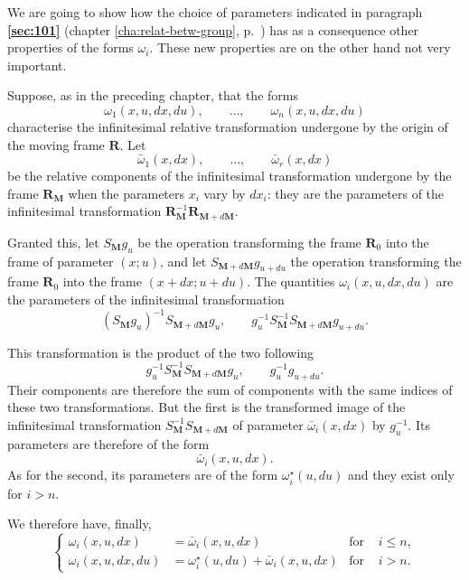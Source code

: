 \documentclass[leqno,11pt]{book}
\numberwithin{equation}{chapter}
\theoremstyle{shape1}
\theoremstyle{shapesmall}
\newcommand{\fsref}[1]{{\rm\textsection\textbf{\ref{sec:#1}}}}
\newcommand{\str}{^{\star}}
\begin{document}
{\small
We are going to show how the choice of parameters indicated in paragraph \fsref{101} (chapter \ref{cha:relat-betw-group}, p.~\pageref{sec:101}) has as a consequence other properties of the forms $\omega_{i}$. These new properties are on the other hand not very important.

Suppose, as in the preceding chapter, that the forms
\[
\omega_{1}(x,u,dx,du),\qquad\dots,\qquad\omega_{n}(x,u,dx,du)
\]
characterise the infinitesimal relative transformation undergone by the origin of the moving frame $\mathbf{R}$. Let 
\[
\bar\omega_{1}(x,dx),\qquad\dots,\qquad\bar\omega_{r}(x,dx)
\]
be the relative components of the infinitesimal transformation undergone by the frame $\mathbf{R}_{\mathbf{M}}$ when the parameters $x_{i}$ vary by $dx_{i}$: they are the parameters of the infinitesimal transformation $\mathbf{R}^{-1}_{\mathbf{M}}\mathbf{R}_{\mathbf{M}+d\mathbf{M}}$.

Granted this, let $S_{\mathbf{M}}g_{u}$ be the operation transforming the frame $\mathbf{R}_{0}$ into the frame of parameter $(x;u)$, and let $S_{\mathbf{M}+d\mathbf{M}}g_{u+du}$ the operation transforming the frame $\mathbf{R}_{0}$ into the frame $(x+dx;u+du)$. The quantities $\omega_{i}(x,u,dx,du)$ are the parameters of the infinitesimal transformation
\[
(S_{\mathbf{M}}g_{u})^{-1}S_{\mathbf{M}+d\mathbf{M}}g_{u},\qquad g^{-1}_{u}S^{-1}_{\mathbf{M}}S_{\mathbf{M}+d\mathbf{M}}g_{u+du}.
\]

This transformation is the product of the two following
\[
g^{-1}_{u}S_{\mathbf{M}}^{-1}S_{\mathbf{M}+d\mathbf{M}}g_{u},\qquad g_{u}^{-1}g_{u+du}.
\]
Their components are therefore the sum of components with the same indices of these two transformations. But the first is the transformed image of the infinitesimal transformation $S_{\mathbf{M}}^{-1}S_{\mathbf{M}+d\mathbf{M}}$ of parameter $\bar\omega_{i}(x,dx)$ by $g_{u}^{-1}$. Its parameters are therefore of the form
\[
\bar\omega_{i}(x,u,dx).
\]
As for the second, its parameters are of the form $\omega\str_{i}(u,du)$ and they exist only for $i>n$.

We therefore have, finally,
\begin{equation}
  \label{eq:8.11}
  \left\{
    \begin{aligned}
      \omega_{i}(x,u,dx)&=\bar\omega_{i}(x,u,dx)&\text{for }&i\le n,\\
      \omega_{i}(x,u,dx,du)&=\omega\str_{i}(u,du)+\bar\omega_{i}(x,u,dx)&\text{for }&i> n.
    \end{aligned}
  \right.
\end{equation}

}
\end{document}

